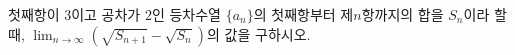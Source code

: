 첫째항이 $3$이고 공차가 $2$인 등차수열 $\{a_n\}$의 첫째항부터 제$n$항까지의 합을 $S_n$이라 할 때, $\displaystyle\lim_{n\to\infty}(\sqrt{S_{n+1}}-\sqrt{S_n})$의 값을 구하시오.
